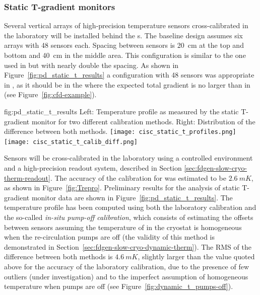 \subsubsection{Static T-gradient monitors}
\label{sec:fdgen-slow-cryo-static-therm}

Several vertical arrays of high-precision temperature sensors cross-calibrated in the laboratory will be installed behind the s.  
The baseline design assumes six arrays with \num{48} sensors each. Spacing between sensors
is \SI{20}{cm} at the top and bottom and \SI{40}{cm} in the middle area. This configuration is similar to the one used in  but with nearly double the spacing. 
As shown in Figure~\ref{fig:pd_static_t_results} a configuration with \num{48} sensors was appropriate in , as it should be in the  where the expected total gradient is no larger than in  (see Figure~\ref{fig:cfd-example}). 

\begin{dunefigure}{fig:pd_static_t_results}{
 Left: Temperature profile as measured by the static T-gradient monitor for two different calibration methods. Right: Distribution of the difference between both methods.}
  \texttt{[image: cisc\_static\_t\_profiles.png]}%
  \texttt{[image: cisc\_static\_t\_calib\_diff.png]}%
\end{dunefigure}

Sensors will be cross-calibrated in the laboratory using a controlled environment and a high-precision readout system, described in Section \ref{sec:fdgen-slow-cryo-therm-readout}.
The accuracy of the calibration for  was estimated to be $\SI{2.6}{mK}$, as shown in Figure~\ref{fig:Trepro}. Preliminary results for the analysis of  static T-gradient monitor data are shown in Figure~\ref{fig:pd_static_t_results}. The temperature profile has been computed using both the laboratory calibration and the so-called \textit{in-situ pump-off calibration}, which consists %
of estimating the offsets between sensors assuming the temperature of  in the cryostat is homogeneous when the re-circulation pumps are off (the validity of this method is demonstrated in Section~\ref{sec:fdgen-slow-cryo-dynamic-therm}).  
The RMS of the difference between both methods is $\SI{4.6}{mK}$, slightly larger than the value quoted above for the accuracy of the laboratory calibration, due to the presence of few outliers (under investigation) and to the imperfect assumption of homogeneous temperature when pumps are off (see Figure~\ref{fig:dynamic_t_pumps-off}).  


